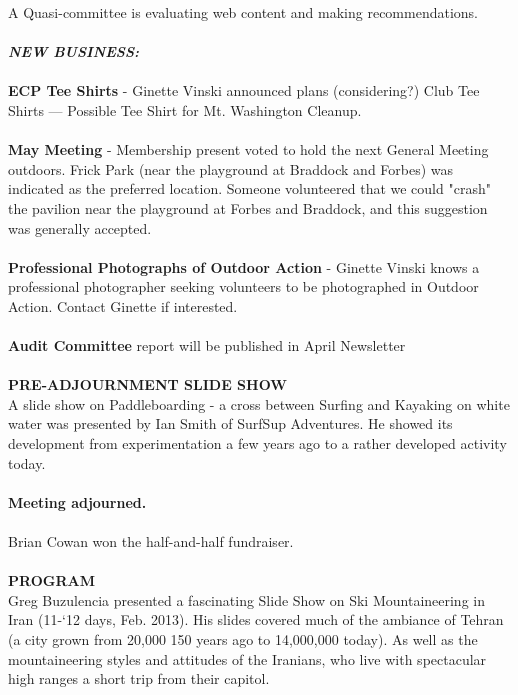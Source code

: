 \documentclass[10pt,a4paper]{article}
\begin{document}
\begin{multicols}{2}
A Quasi-committee is evaluating web content and making recommendations.
\\
\\
\textit{\textbf{NEW BUSINESS:}}
\\
\\
\textbf{ECP Tee Shirts} - Ginette Vinski announced plans (considering?) Club Tee Shirts --- Possible Tee Shirt for Mt. Washington Cleanup.
\\
\\
\textbf{May Meeting} -  Membership present voted to hold the next General Meeting outdoors.  Frick Park (near the playground at Braddock and Forbes) was indicated as the preferred location.  Someone volunteered that we could "crash" the pavilion near the playground at Forbes and Braddock, and this suggestion was generally accepted.
\\
\\
\textbf{Professional Photographs of Outdoor Action} - Ginette Vinski knows a professional photographer seeking volunteers to be photographed in Outdoor Action.  Contact Ginette if interested.
\\
\\
\textbf{Audit Committee} report will be published in April Newsletter
\\
\\
\textbf{PRE-ADJOURNMENT SLIDE SHOW}\\
A slide show on Paddleboarding - a cross between Surfing and Kayaking on white water was presented by Ian Smith of SurfSup Adventures.  He showed its development from experimentation a few years ago to a rather developed activity today.
\\
\\
\textbf{Meeting adjourned.}
\\
\\
Brian Cowan won the half-and-half fundraiser.
\\
\\
\textbf{PROGRAM}\\
Greg Buzulencia presented a fascinating Slide Show on Ski Mountaineering in Iran (11-`12 days, Feb. 2013). His slides covered much of the ambiance of Tehran (a city grown from 20,000 150 years ago to 14,000,000 today). As well as the mountaineering styles and attitudes of  the Iranians, who live with spectacular high ranges a short trip from their capitol.


\end{multicols}
\end{document}
